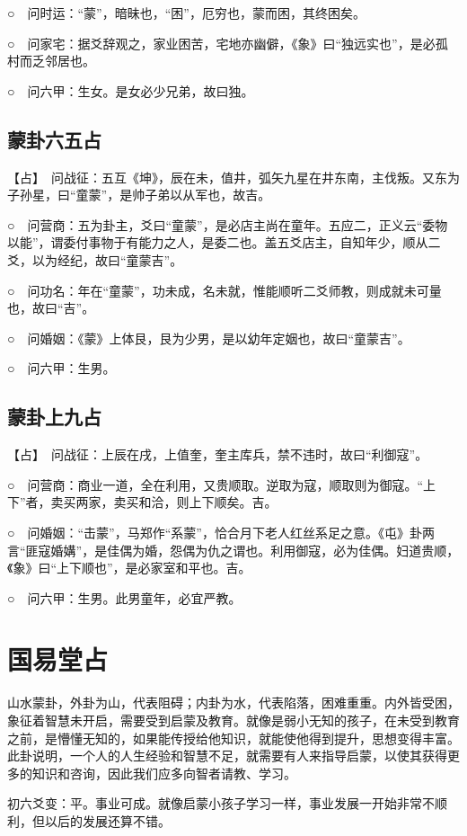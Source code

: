 \documentclass[12pt,oneside]{book}
\begin{document}
○　问时运：“蒙”，暗昧也，“困”，厄穷也，蒙而困，其终困矣。

○　问家宅：据爻辞观之，家业困苦，宅地亦幽僻，《象》曰“独远实也”，是必孤村而乏邻居也。

○　问六甲：生女。是女必少兄弟，故曰独。

\subsection{蒙卦六五占}
【占】　问战征：五互《坤》，辰在未，值井，弧矢九星在井东南，主伐叛。又东为子孙星，曰“童蒙”，是帅子弟以从军也，故吉。

○　问营商：五为卦主，爻曰“童蒙”，是必店主尚在童年。五应二，正义云“委物以能”，谓委付事物于有能力之人，是委二也。盖五爻店主，自知年少，顺从二爻，以为经纪，故曰“童蒙吉”。

○　问功名：年在“童蒙”，功未成，名未就，惟能顺听二爻师教，则成就未可量也，故曰“吉”。

○　问婚姻：《蒙》上体艮，艮为少男，是以幼年定姻也，故曰“童蒙吉”。

○　问六甲：生男。

\subsection{蒙卦上九占}
【占】　问战征：上辰在戌，上值奎，奎主库兵，禁不违时，故曰“利御寇”。

○　问营商：商业一道，全在利用，又贵顺取。逆取为寇，顺取则为御寇。“上下”者，卖买两家，卖买和洽，则上下顺矣。吉。

○　问婚姻：“击蒙”，马郑作“系蒙”，恰合月下老人红丝系足之意。《屯》卦两言“匪寇婚媾”，是佳偶为婚，怨偶为仇之谓也。利用御寇，必为佳偶。妇道贵顺，《象》曰“上下顺也”，是必家室和平也。吉。

○　问六甲：生男。此男童年，必宜严教。



\section{国易堂占}
山水蒙卦，外卦为山，代表阻碍；内卦为水，代表陷落，困难重重。内外皆受困，象征着智慧未开启，需要受到启蒙及教育。就像是弱小无知的孩子，在未受到教育之前，是懵懂无知的，如果能传授给他知识，就能使他得到提升，思想变得丰富。此卦说明，一个人的人生经验和智慧不足，就需要有人来指导启蒙，以使其获得更多的知识和咨询，因此我们应多向智者请教、学习。

初六爻变：平。事业可成。就像启蒙小孩子学习一样，事业发展一开始非常不顺利，但以后的发展还算不错。
\end{document}
